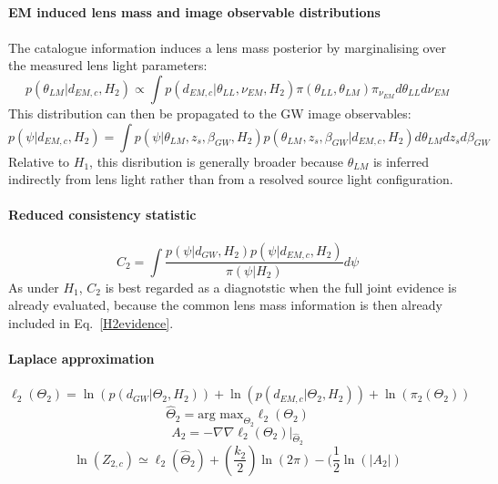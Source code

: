 \documentclass[pdflatex,sn-mathphys-num]{sn-jnl}%
\theoremstyle{thmstyleone}%
\theoremstyle{thmstyletwo}%
\theoremstyle{thmstylethree}%
\begin{document}
\begin{appendices}
\\
\textbf{EM induced lens mass and image observable distributions}\\
\\
The catalogue information induces a lens mass posterior by marginalising over the measured lens light parameters:
\begin{equation}
p(\theta_{LM}|d_{EM,c},H_2) \propto \int p(d_{EM,c}|\theta_{LL},\nu_{EM},H_2)\pi(\theta_{LL},\theta_{LM})\pi_{\nu_{EM}}d\theta_{LL}d\nu_{EM}
\end{equation}
This distribution can then be propagated to the GW image observables:
\begin{equation}	
p(\psi|d_{EM,c},H_2) = \int p(\psi|\theta_{LM},z_s,\beta_{GW},H_2) p(\theta_{LM},z_s,\beta_{GW}|d_{EM,c},H_2) d\theta_{LM}dz_sd\beta_{GW}
\end{equation}
Relative to $H_1$, this disribution is generally broader because $\theta_{LM}$ is inferred indirectly from lens light rather than from a resolved source light configuration.\\
\\
\textbf{Reduced consistency statistic}\\
\\
\begin{equation}
C_2 = \int \frac{p(\psi|d_{GW},H_2)p(\psi|d_{EM,c},H_2)}{\pi(\psi|H_2)}d\psi
\end{equation}
	As under $H_1$, $C_2$ is best regarded as a diagnotstic when the full joint evidence is already evaluated, because the common lens mass information is then already included in Eq.~\eqref{H2evidence}.\\
\\
\textbf{Laplace approximation}\\
\\
\begin{equation}
\ell_2(\Theta_2) = \ln(p(d_{GW}|\Theta_2,H_2)) + \ln(p(d_{EM,c}|\Theta_2,H_2)) + \ln(\pi_2(\Theta_2))
\end{equation}
\begin{equation}
\hat\Theta_2 = \text{arg max}_{\Theta_2}\ell_2(\Theta_2)
\end{equation}
\begin{equation}
A_2 = -\nabla\nabla\ell_2(\Theta_2)|_{\hat\Theta_2}
\end{equation}
\begin{equation}
\ln(Z_{2,c}) \simeq \ell_2(\hat\Theta_2)+(\frac{k_2}{2})\ln(2\pi)-(\frac{1}{2}\ln(|A_2|)
\end{equation}

\end{appendices}
\end{document}
